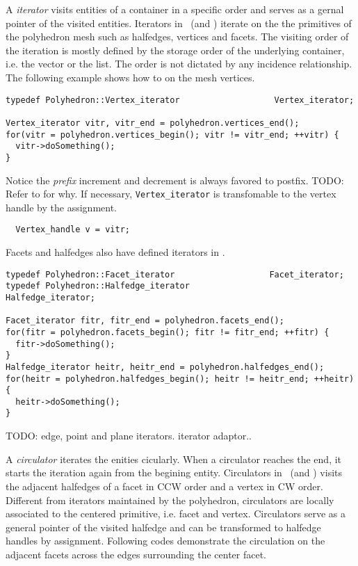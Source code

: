 A \emph{iterator} visits entities of a container in a specific 
order and serves as a gernal pointer of the visited entities. 
Iterators in \cgalpoly\ (and \cgalhds) iterate on the 
the primitives of the polyhedron mesh such as halfedges, 
vertices and facets. The visiting order of the iteration
is mostly defined by the storage order of the underlying
container, i.e. the vector or the list. The order
is not dictated by any incidence relationship.
The following example shows how to  on the mesh
vertices.
\begin{lstlisting}
typedef Polyhedron::Vertex_iterator                   Vertex_iterator;

Vertex_iterator vitr, vitr_end = polyhedron.vertices_end();
for(vitr = polyhedron.vertices_begin(); vitr != vitr_end; ++vitr) {
  vitr->doSomething();
}
\end{lstlisting}
Notice the \emph{prefix} increment and decrement is always favored
to postfix. TODO: Refer to \cite{???} for why.
If necessary, \lstinline!Vertex_iterator! is transfomable to the vertex
handle by the assignment. 
\begin{lstlisting}
  Vertex_handle v = vitr;
\end{lstlisting}
Facets and halfedges also have defined iterators in \poly .
\begin{lstlisting}
typedef Polyhedron::Facet_iterator                   Facet_iterator;
typedef Polyhedron::Halfedge_iterator                Halfedge_iterator;

Facet_iterator fitr, fitr_end = polyhedron.facets_end();
for(fitr = polyhedron.facets_begin(); fitr != fitr_end; ++fitr) {
  fitr->doSomething();
}
Halfedge_iterator heitr, heitr_end = polyhedron.halfedges_end();
for(heitr = polyhedron.halfedges_begin(); heitr != heitr_end; ++heitr) {
  heitr->doSomething();
}
\end{lstlisting}

TODO: edge, point and plane iterators. iterator adaptor..

A \emph{circulator} iterates the enities cicularly. 
When a circulator reaches the end, it
starts the iteration again from the begining entity.
Circulators in \cgalpoly\ (and \cgalhds) visits the 
adjacent halfedges of a facet in CCW order and
a vertex in CW order. Different from iterators maintained by 
the polyhedron, circulators are locally associated to
the centered primitive, i.e. facet and vertex. 
Circulators serve as a general pointer of the visited halfedge
and can be transformed to halfedge handles by assignment.
Following codes demonstrate the circulation on the adjacent facets
across the edges surrounding the center facet.

